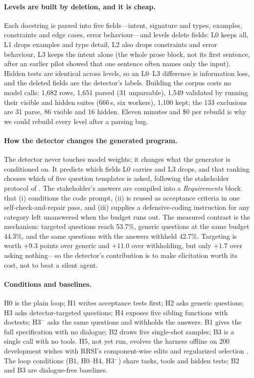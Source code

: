 \documentclass{article}
\begin{document}
\paragraph{Levels are built by deletion, and it is cheap.}
Each docstring is parsed into five fields---intent, signature and types, examples, constraints
and edge cases, error behaviour---and levels delete fields: L0 keeps all, L1 drops examples and
type detail, L2 also drops constraints and error behaviour, L3 keeps the intent alone (the whole
prose block, not its first sentence, after an earlier pilot showed that one sentence often names only the
input). Hidden tests are identical across levels, so an L0--L3 difference is information loss, and
the deleted fields are the detector's labels. Building the corpus costs no model calls: 1{,}682 rows, 1{,}651 parsed (31 unparsable), 1{,}549 validated by running their visible and hidden suites (666\,s, six workers), 1{,}100 kept; the 133 exclusions are 31 parse, 86 visible and 16 hidden. Eleven minutes and \$0 per rebuild is why we could rebuild every level after a parsing bug.

\paragraph{How the detector changes the generated program.}
The detector never touches model weights; it changes what the generator is conditioned on. It
predicts which fields L0 carries and L3 drops, and that ranking chooses which of five question
templates is asked, following the stakeholder protocol of \citep{mu2023clarifygpt}. The
stakeholder's answers are compiled into a \emph{Requirements} block that
(i) conditions the code prompt, (ii) is reused as acceptance criteria in one
self-check-and-repair pass, and (iii) supplies a defensive-coding instruction for any category left
unanswered when the budget runs out. The measured contrast is the mechanism:
targeted questions reach 53.7\%, generic questions at the same budget 44.3\%, and the same
questions with the answers withheld 42.7\%. Targeting is worth $+9.3$ points over generic and
$+11.0$ over withholding, but only $+1.7$ over asking nothing---so the detector's contribution
is to make elicitation worth its cost, not to beat a silent agent.

\paragraph{Conditions and baselines.}
H0 is the plain loop; H1 writes acceptance tests first; H2 asks generic questions; H3 asks
detector-targeted questions; H4 exposes five sibling functions with doctests; H3$^-$ asks the same questions and
withholds the answers. B1 gives the full specification with no dialogue; B2 draws five single-shot
samples; B3 is a single call with no tools. H5, not yet run, evolves the harness offline on 200 development wishes with RRSI's
component-wise edits and regularized selection \citep{xia2026rrsi}. The
loop conditions (B1, H0--H4, H3$^-$) share tasks, tools and hidden tests; B2 and B3 are
dialogue-free baselines.
\end{document}
